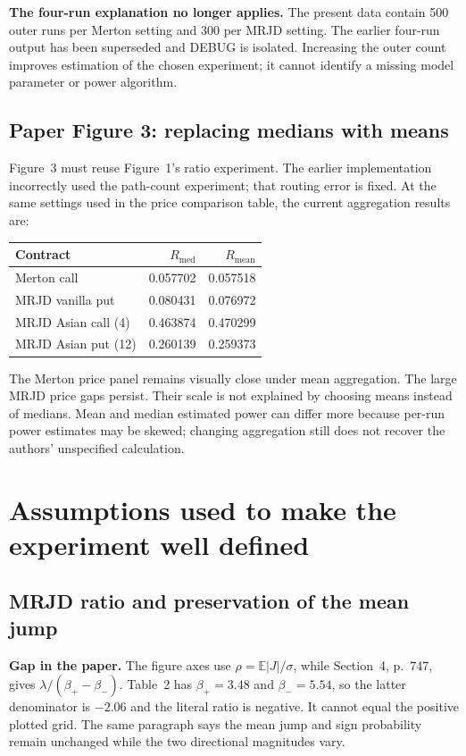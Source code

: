\documentclass[11pt,a4paper]{article}
\newcommand{\E}{\mathbb{E}}
\begin{document}
\textbf{The four-run explanation no longer applies.} The present data
contain 500 outer runs per Merton setting and 300 per MRJD setting.
The earlier four-run output has been superseded and DEBUG is isolated.
Increasing the outer count improves estimation of the chosen experiment;
it cannot identify a missing model parameter or power algorithm.

\clearpage
\subsection{Paper Figure 3: replacing medians with means}
Figure~3 must reuse Figure~1's ratio experiment. The earlier implementation
incorrectly used the path-count experiment; that routing error is fixed.
At the same settings used in the price comparison table, the current
aggregation results are:
\begin{center}\small
\begin{tabular}{@{}lrr@{}}
\toprule
Contract & $R_{\mathrm{med}}$ & $R_{\mathrm{mean}}$\\
\midrule
Merton call & 0.057702 & 0.057518 \\
MRJD vanilla put & 0.080431 & 0.076972 \\
MRJD Asian call (4) & 0.463874 & 0.470299 \\
MRJD Asian put (12) & 0.260139 & 0.259373 \\
\bottomrule
\end{tabular}
\end{center}
The Merton price panel remains visually close under mean aggregation.
The large MRJD price gaps persist. Their scale is not explained by
choosing means instead of medians. Mean and median estimated power can
differ more because per-run power estimates may be skewed; changing
aggregation still does not recover the authors' unspecified calculation.

\section{Assumptions used to make the experiment well defined}
\subsection{MRJD ratio and preservation of the mean jump}
\textbf{Gap in the paper.} The figure axes use
$\rho=\E|J|/\sigma$, while Section~4, p.~747, gives
$\lambda/(\beta_+-\beta_-)$. Table~2 has $\beta_+=3.48$ and
$\beta_-=5.54$, so the latter denominator is $-2.06$ and the literal
ratio is negative. It cannot equal the positive plotted grid.
The same paragraph says the mean jump and sign probability remain
unchanged while the two directional magnitudes vary.
\end{document}
